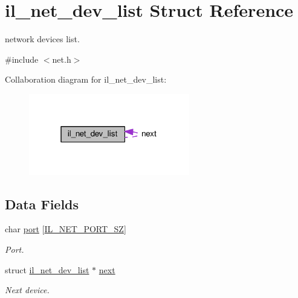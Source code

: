 \hypertarget{structil__net__dev__list}{}\section{il\+\_\+net\+\_\+dev\+\_\+list Struct Reference}
\label{structil__net__dev__list}


network devices list.  




{\ttfamily \#include $<$net.\+h$>$}



Collaboration diagram for il\+\_\+net\+\_\+dev\+\_\+list\+:\nopagebreak
\begin{figure}[H]
\begin{center}
\leavevmode
\includegraphics[width=199pt]{structil__net__dev__list__coll__graph}
\end{center}
\end{figure}
\subsection*{Data Fields}
\begin{DoxyCompactItemize}
\item 
char \hyperlink{structil__net__dev__list_afda23220e636423e482e27f89fd0535c}{port} \mbox{[}\hyperlink{group__IL__NET_ga9c33d1c3bf660e4cb980a9e7a676cb88}{I\+L\+\_\+\+N\+E\+T\+\_\+\+P\+O\+R\+T\+\_\+\+SZ}\mbox{]}
\begin{DoxyCompactList}\small\item\em Port. \end{DoxyCompactList}\item 
struct \hyperlink{structil__net__dev__list}{il\+\_\+net\+\_\+dev\+\_\+list} $\ast$ \hyperlink{structil__net__dev__list_a2e1b5a2bd11d369da751960e819272e0}{next}\hypertarget{structil__net__dev__list_a2e1b5a2bd11d369da751960e819272e0}{}\label{structil__net__dev__list_a2e1b5a2bd11d369da751960e819272e0}

\begin{DoxyCompactList}\small\item\em Next device. \end{DoxyCompactList}\end{DoxyCompactItemize}


